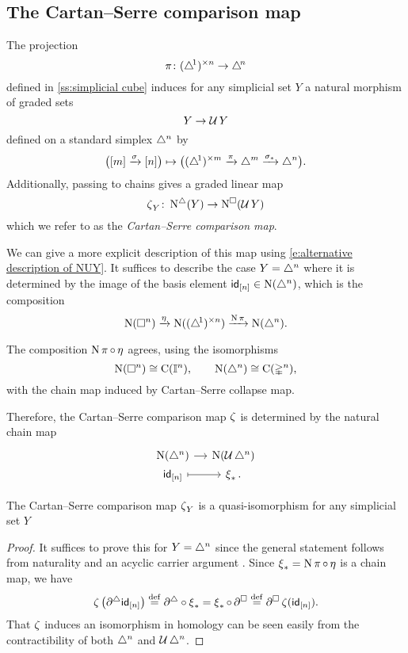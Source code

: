 \subsection{The Cartan--Serre comparison map} \label{ss:comparison map}

The projection
\[
\operatorname{\pi} \colon (\triangle^{\!1})^{\times n} \to \triangle^{\!n}
\]
defined in \cref{ss:simplicial cube} induces for any simplicial set $Y$ a natural morphism of graded sets
\[
Y \to \operatorname{\mathcal{U}} Y
\]
defined on a standard simplex $\triangle^n$ by
\[
\big( [m] \xrightarrow{\sigma} [n] \big) \mapsto
\big( (\triangle^{\!1})^{\times m} \xrightarrow{\operatorname{\pi}} \triangle^m \xrightarrow{\sigma_\ast} \triangle^n \big).
\]
Additionally, passing to chains gives a graded linear map
\[
\operatorname{\zeta}_Y \colon \operatorname{N^{\triangle}}(Y) \to \operatorname{N^{\square}}(\operatorname{\mathcal{U}} Y)
\]
which we refer to as the \textit{Cartan--Serre comparison map}.

We can give a more explicit description of this map using \eqref{e:alternative description of NUY}.
It suffices to describe the case $Y = \triangle^n$ where it is determined by the image of the basis element $\mathsf{id}_{[n]} \in \operatorname{N}(\triangle^n)$, which is the composition
\[
\operatorname{N}(\square^n) \xrightarrow{\operatorname{\eta}} \operatorname{N}((\triangle^{\!1})^{\times n}) \xrightarrow{\operatorname{N} \operatorname{\pi}} \operatorname{N}(\triangle^n).
\]

\begin{lemma}
	The composition $\operatorname{N} \operatorname{\pi} \circ \operatorname{\eta}$ agrees, using the isomorphisms
	\[
	\operatorname{N}(\square^n) \cong \operatorname{C}(\mathbb{I}^n), \qquad
	\operatorname{N}(\triangle^n) \cong \operatorname{C}(\mathbb{\Delta}^n),
	\]
	with the chain map induced by Cartan--Serre collapse map.
\end{lemma}

Therefore, the Cartan--Serre comparison map $\operatorname{\zeta}$ is determined by the natural chain map
\[
\begin{tikzcd}[column sep=small, row sep=0]
\chains(\simplex^n) \arrow[r] &
\chains(\cubify \simplex^n) \\
\id_{[n]} \arrow[r, mapsto] &
\CScollapse_\ast.
\end{tikzcd}
\]

\begin{lemma}
	The Cartan--Serre comparison map $\operatorname{\zeta}_Y$ is a quasi-isomorphism for any simplicial set $Y$
\end{lemma}

\begin{proof}
	It suffices to prove this for $Y = \triangle^n$ since the general statement follows from naturality and an acyclic carrier argument \cite{eilenberg1953acyclic}.
	Since $\operatorname{\xi}_\ast = \operatorname{N} \operatorname{\pi} \circ \operatorname{\eta}$ is a chain map, we have
	\begin{align*}
	\operatorname{\zeta} \big( \partial^\triangle \mathsf{id}_{[n]} \big) \stackrel{\mathrm{def}}{=}
	\partial^\triangle \circ \operatorname{\xi}_\ast =
	\operatorname{\xi}_\ast \circ \, \partial^\square \stackrel{\mathrm{def}}{=}
	\partial^\square \operatorname{\zeta} (\mathsf{id}_{[n]}).
	\end{align*}
	That $\operatorname{\zeta}$ induces an isomorphism in homology can be seen easily from the contractibility of both $\triangle^n$ and $\operatorname{\mathcal{U}} \triangle^n$.
\end{proof}

